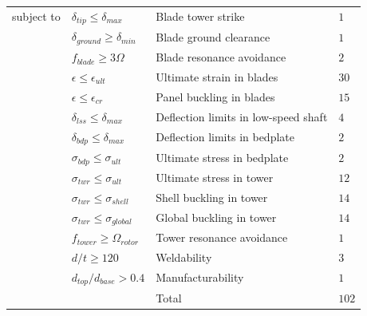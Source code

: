 \documentclass[]{aiaa-tc} %
\begin{document}
\begin{table}[!htb]
\begin{tabular}{r l l l}
            \\
            subject to          & $\delta_{tip} \le \delta_{max}$ & Blade tower strike & $1$ \\
                                    & $\delta_{ground} \ge \delta_{min}$ & Blade ground clearance & $1$ \\
                                    & $f_{blade} \ge 3 \Omega$ & Blade resonance avoidance & $2$ \\
                                    & $\epsilon \le \epsilon_{ult}$ & Ultimate strain in blades & $30$ \\
                                    & $\epsilon \le \epsilon_{cr}$ & Panel buckling in blades & $15$ \\
                                    & $\delta_{lss} \le \delta_{max}$ & Deflection limits in low-speed shaft & $4$ \\
                                    & $\delta_{bdp} \le \delta_{max}$ & Deflection limits in bedplate & $2$ \\
                                    & $\sigma_{bdp} \le \sigma_{ult}$ & Ultimate stress in bedplate & $2$ \\
                                    & $\sigma_{twr} \le \sigma_{ult}$ & Ultimate stress in tower & $12$ \\
                                    & $\sigma_{twr} \le \sigma_{shell}$ & Shell buckling in tower & $14$ \\
                                    & $\sigma_{twr} \le \sigma_{global}$ & Global buckling in tower & $14$ \\
                                    & $f_{tower} \ge \Omega_{rotor}$ & Tower resonance avoidance & $1$ \\
                                    & $d/t \ge 120$ & Weldability & $3$ \\
                                    & $d_{top}/d_{base} > 0.4$ & Manufacturability & $1$ \\
                                    & & Total & $102$ \\
            \bottomrule
        \end{tabular}
        \label{tab:coe_formulation}
    \end{table}
\end{document}
